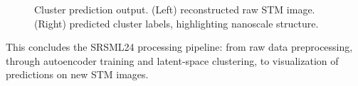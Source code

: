 \documentclass[11pt]{article}
\begin{document}
\begin{figure}[H]
\centering
\hspace{1em}
\caption{Cluster prediction output. (Left) reconstructed raw STM image. (Right) predicted cluster labels, highlighting nanoscale structure.}
\end{figure}

This concludes the SRSML24 processing pipeline: from raw data preprocessing, through autoencoder training and latent-space clustering, to visualization of predictions on new STM images.
\end{document}
